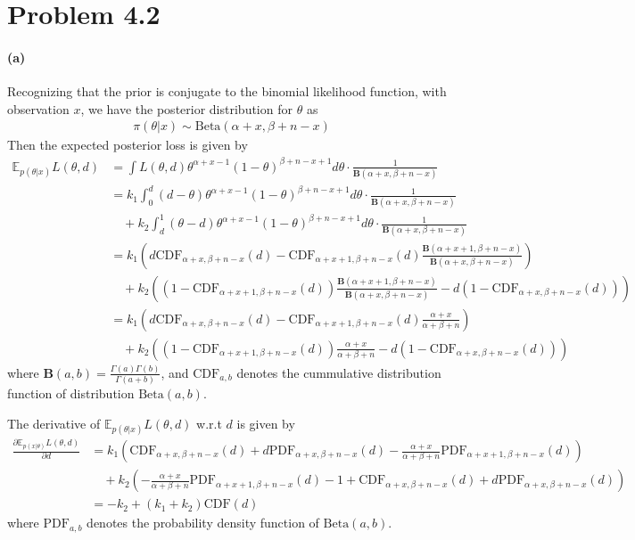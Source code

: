 \section{Problem 4.2}
\paragraph{(a)}
Recognizing that the prior is conjugate to the binomial likelihood function, with observation $x$, we have the posterior distribution for $\theta$ as
\begin{align*}
    \pi(\theta \vert x) \sim \mathrm{Beta}(\alpha +x , \beta + n-x)
\end{align*}
Then the expected posterior loss is given by
\begin{align*}
    \mathbb{E}_{p(\theta \vert x)} L(\theta, d)
    &= \int L(\theta, d) \theta^{\alpha +x -1} (1-\theta)^{\beta +n -x +1} d\theta \cdot \frac{1}{\mathbf{B}(\alpha+x, \beta+n-x)}\\
    &=  k_1 \int_{0}^{d} (d-\theta)\theta^{\alpha +x -1} (1-\theta)^{\beta +n -x +1} d\theta \cdot \frac{1}{\mathbf{B}(\alpha+x, \beta+n-x)} \\
    &   \quad + k_2 \int_{d}^{1} (\theta-d)\theta^{\alpha +x -1} (1-\theta)^{\beta +n -x +1} d\theta \cdot \frac{1}{\mathbf{B}(\alpha+x, \beta+n-x)}\\
    &= k_1\left(d\mathrm{CDF}_{\alpha+x, \beta+n-x}(d) - \mathrm{CDF}_{\alpha+x+1, \beta+n-x}(d) \frac{\mathbf{B}(\alpha+x+1, \beta+n-x)}{\mathbf{B}(\alpha+x, \beta+n-x)} \right)\\
    &   \quad + k_2\left( (1-\mathrm{CDF}_{\alpha+x+1, \beta+n-x}(d))\frac{\mathbf{B}(\alpha+x+1, \beta+n-x)}{\mathbf{B}(\alpha+x, \beta+n-x)} - d(1-\mathrm{CDF}_{\alpha+x, \beta+n-x}(d))\right)\\
    &= k_1\left(d\mathrm{CDF}_{\alpha+x, \beta+n-x}(d) - \mathrm{CDF}_{\alpha+x+1, \beta+n-x}(d) \frac{\alpha+x}{\alpha+\beta+n} \right) \\
    &   \quad + k_2\left( (1-\mathrm{CDF}_{\alpha+x+1, \beta+n-x}(d))\frac{\alpha+x}{\alpha+\beta+n} - d(1-\mathrm{CDF}_{\alpha+x, \beta+n-x}(d))\right)
\end{align*}
where $\mathbf{B}(a, b)=\frac{\Gamma(a)\Gamma(b)}{\Gamma(a+b)}$, and $\mathrm{CDF}_{a, b}$ denotes the cummulative distribution function of distribution $\mathrm{Beta}(a, b)$.

The derivative of $\mathbb{E}_{p(\theta \vert x)} L(\theta, d)$ w.r.t $d$ is given by
\begin{align*}
    \frac{\partial \mathbb{E}_{p(x \vert \theta)} L(\theta, d)}{\partial d}
    &= k_1\left(\mathrm{CDF}_{\alpha+x, \beta+n-x}(d) + d\mathrm{PDF}_{\alpha+x, \beta+n-x}(d) - \frac{\alpha+x}{\alpha+\beta+n} \mathrm{PDF}_{\alpha+x+1, \beta+n-x}(d)\right)\\
    & \quad + k_2\left(- \frac{\alpha+x}{\alpha+\beta+n} \mathrm{PDF}_{\alpha+x+1, \beta+n-x}(d) - 1 + \mathrm{CDF}_{\alpha+x, \beta+n-x}(d) + d\mathrm{PDF}_{\alpha+x, \beta+n-x}(d) \right)\\
    &= -k_2 + (k_1+k_2) \mathrm{CDF}(d)
\end{align*}
where $\mathrm{PDF}_{a, b}$ denotes the probability density function of $\mathrm{Beta}(a, b)$.

